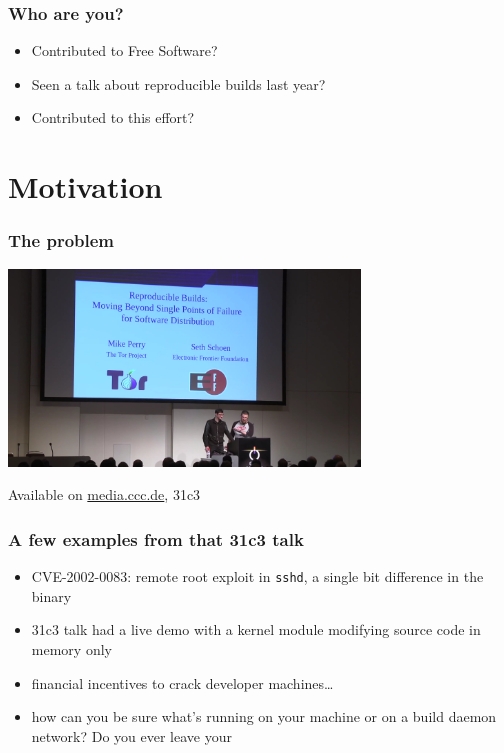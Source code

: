 \documentclass[14pt]{beamer}
\begin{document}
\begin{frame}
 \frametitle{Who are you?}
 \begin{itemize}
  \item Contributed to Free Software?
  \item<2-3> Seen a talk about reproducible builds last year?
  \item<3> Contributed to this effort?
 \end{itemize}
\end{frame}

\section{Motivation}

\begin{frame}
 \frametitle{The problem}

 \begin{center}
  \includegraphics[width=0.7\textwidth]{images/31c3.png}

  Available on \url{media.ccc.de}, 31c3
 \end{center}
\end{frame}

\begin{frame}[fragile]
 \frametitle{A few examples from that 31c3 talk}
 \begin{itemize}
  \item CVE-2002-0083: remote root exploit in \texttt{sshd}, a single bit difference in the binary
  \item<2-5> 31c3 talk had a live demo with a kernel module modifying source code in memory only
  \item<3-5> financial incentives to crack developer machines…
  \item<4-5> {how can you be sure what's running on your machine or on a build
  daemon network? Do you ever leave your} 
 \end{itemize}
\end{frame}
\end{document}

